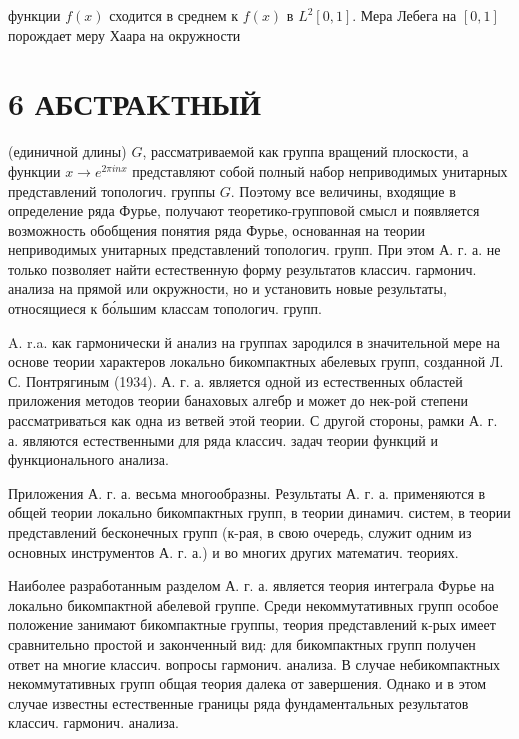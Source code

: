 \documentclass[10pt]{article}
\begin{document}
функции $f(x)$ сходится в среднем к $f(x)$ в $L^{2}[0,1]$. Мера Лебега на $[0,1]$ порождает меру Хаара на окружности



\section{6 АБСТРАKТНЫЙ}

(единичной длины) $G$, рассматриваемой как группа вращений плоскости, а функции $x \rightarrow e^{2 \pi i n x}$ представляют собой полный набор неприводимых унитарных представлений топологич. группы $G$. Поэтому все величины, входящие в определение ряда Фурье, получают теоретико-групповой смысл и появляется возможность обобщения понятия ряда Фурье, основанная на теории неприводимых унитарных представлений топологич. групп. При этом А. г. а. не только позволяет найти естественную форму результатов классич. гармонич. анализа на прямой или окружности, но и установить новые результаты, относящиеся к бо́льшим классам топологич. групп.



A. r.a. как гармонически й анализ на группах зародился в значительной мере на основе теории характеров локально бикомпактных абелевых групп, созданной Л. С. Понтрягиным (1934). А. г. а. является одной из естественных областей приложения методов теории банаховых алгебр и может до нек-рой степени рассматриваться как одна из ветвей этой теории. С другой стороны, рамки А. г. а. являются естественными для ряда классич. задач теории функций и функционального анализа.



Приложения А. г. а. весьма многообразны. Результаты А. г. а. применяются в общей теории локально бикомпактных групп, в теории динамич. систем, в теории представлений бесконечных групп (к-рая, в свою очередь, служит одним из основных инструментов А. г. а.) и во многих других математич. теориях.



Наиболее разработанным разделом А. г. а. является теория интеграла Фурье на локально бикомпактной абелевой группе. Среди некоммутативных групп особое положение занимают бикомпактные группы, теория представлений к-рых имеет сравнительно простой и законченный вид: для бикомпактных групп получен ответ на многие классич. вопросы гармонич. анализа. В случае небикомпактных некоммутативных групп общая теория далека от завершения. Однако и в этом случае известны естественные границы ряда фундаментальных результатов классич. гармонич. анализа.
\end{document}

